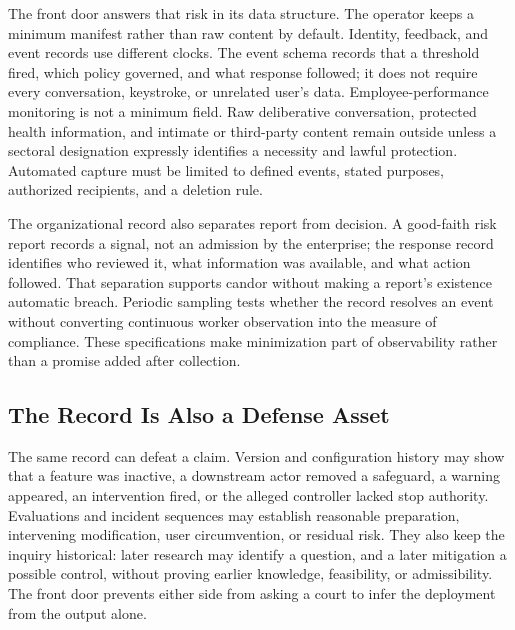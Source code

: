 The front door answers that risk in its data structure. The operator keeps a minimum manifest rather than raw content by default. Identity, feedback, and event records use different clocks. The event schema records that a threshold fired, which policy governed, and what response followed; it does not require every conversation, keystroke, or unrelated user's data. Employee-performance monitoring is not a minimum field. Raw deliberative conversation, protected health information, and intimate or third-party content remain outside unless a sectoral designation expressly identifies a necessity and lawful protection. Automated capture must be limited to defined events, stated purposes, authorized recipients, and a deletion rule.

The organizational record also separates report from decision. A good-faith risk report records a signal, not an admission by the enterprise; the response record identifies who reviewed it, what information was available, and what action followed. That separation supports candor without making a report's existence automatic breach. Periodic sampling tests whether the record resolves an event without converting continuous worker observation into the measure of compliance. These specifications make minimization part of observability rather than a promise added after collection.

\subsection{The Record Is Also a Defense Asset}

The same record can defeat a claim. Version and configuration history may show that a feature was inactive, a downstream actor removed a safeguard, a warning appeared, an intervention fired, or the alleged controller lacked stop authority. Evaluations and incident sequences may establish reasonable preparation, intervening modification, user circumvention, or residual risk. They also keep the inquiry historical: later research may identify a question, and a later mitigation a possible control, without proving earlier knowledge, feasibility, or admissibility. The front door prevents either side from asking a court to infer the deployment from the output alone.

